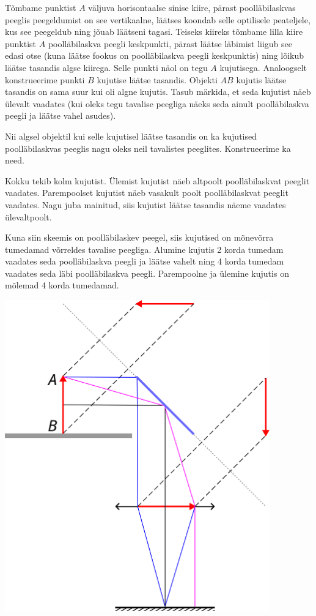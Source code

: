 \documentclass[10pt]{article}
\begin{document}

\solu
\par
Tõmbame punktist $A$ väljuva horisontaalse sinise kiire, pärast poolläbilaskvas peeglis peegeldumist on see vertikaalne, läätses koondab selle optilisele peateljele, kus see peegeldub ning jõuab läätseni tagasi. Teiseks kiireks tõmbame lilla kiire punktist $A$ poolläbilaskva peegli keskpunkti, pärast läätse läbimist liigub see edasi otse (kuna läätse fookus on poolläbilaskva peegli keskpunktis) ning lõikub läätse tasandis algse kiirega. Selle punkti näol on tegu $A$ kujutisega. Analoogselt konstrueerime punkti $B$ kujutise läätse tasandis. Objekti $AB$ kujutis läätse tasandis on sama suur kui oli algne kujutis. Tasub märkida, et seda kujutist näeb ülevalt vaadates (kui oleks tegu tavalise peegliga näeks seda ainult poolläbilaskva peegli ja läätse vahel asudes).

Nii algsel objektil kui selle kujutisel läätse tasandis on ka kujutised poolläbilaskvas peeglis nagu oleks neil tavalistes peeglites. Konstrueerime ka need.

Kokku tekib kolm kujutist. Ülemist kujutist näeb altpoolt poolläbilaskvat peeglit vaadates. Parempoolset kujutist näeb vasakult poolt poolläbilaskvat peeglit vaadates. Nagu juba mainitud, siis kujutist läätse tasandis näeme vaadates ülevaltpoolt.

Kuna siin skeemis on poolläbilaskev peegel, siis kujutised on mõnevõrra tumedamad võrreldes tavalise peegliga. Alumine kujutis 2 korda tumedam vaadates seda poolläbilaskva peegli ja läätse vahelt ning 4 korda tumedam vaadates seda läbi poolläbilaskva peegli. Parempoolne ja ülemine kujutis on mõlemad 4 korda tumedamad.
\begin{center}
  \includegraphics[width=0.86\textwidth]{2023-v3g-03-yl.png}
\end{center}
\probend
\bigskip
\end{document}
